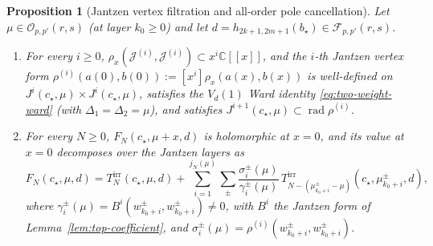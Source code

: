 \documentclass[twoside,10pt]{article}
\numberwithin{equation}{section}
\theoremstyle{slbody}
\newtheorem{proposition}[theorem]{Proposition}
\theoremstyle{definition}
\theoremstyle{remark}
\newcommand{\rad}{\operatorname{rad}}
\begin{document}
\begin{proposition}[Jantzen vertex filtration and all-order pole cancellation]\label{prop:jantzen-vertex}
Let \(\mu\in\mathcal{O}_{p,p'}(r,s)\) (at layer \(k_0\geq0\)) and let
\(d=h_{2k+1,2m+1}(b_\star)\in\mathcal{F}_{p,p'}(r,s)\).
\begin{enumerate}
 \item[(i)] For every \(i\geq0\),
   \(\rho_x(\mathcal{J}^{(i)},\mathcal{J}^{(i)})\subset x^i\mathbb{C}[[x]]\),
   and the \(i\)-th Jantzen vertex form
   \(\rho^{(i)}(a(0),b(0)):=[x^i]\rho_x(a(x),b(x))\) is well-defined on
   \(J^i(c_\star,\mu)\times J^i(c_\star,\mu)\), satisfies the \(V_d(1)\)
   Ward identity \eqref{eq:two-weight-ward} (with \(\Delta_1=\Delta_2=\mu\)),
   and satisfies \(J^{i+1}(c_\star,\mu)\subset\rad\rho^{(i)}\).
 \item[(ii)] For every \(N\geq0\), \(F_N(c_\star,\mu+x,d)\) is holomorphic at
   \(x=0\), and its value at \(x=0\)
   decomposes over the Jantzen layers as
   \begin{equation}\label{eq:jantzen-trace-decomp}
    F_N(c_\star,\mu,d)
    =T^{\mathrm{irr}}_N(c_\star,\mu,d)
     +\sum_{i=1}^{j_N(\mu)}\sum_{\pm}
       \frac{\sigma^\pm_i(\mu)}{\gamma^\pm_i(\mu)}\,
       T^{\mathrm{irr}}_{N-(\mu^\pm_{k_0+i}-\mu)}(c_\star,\mu^\pm_{k_0+i},d),
   \end{equation}
   where \(\gamma^\pm_i(\mu)=B^i(w^\pm_{k_0+i},w^\pm_{k_0+i})\neq0\), with
   \(B^i\) the Jantzen form of Lemma~\ref{lem:top-coefficient}, and
   \(\sigma^\pm_i(\mu)=\rho^{(i)}(w^\pm_{k_0+i},w^\pm_{k_0+i})\).
\end{enumerate}
\end{proposition}
\end{document}
